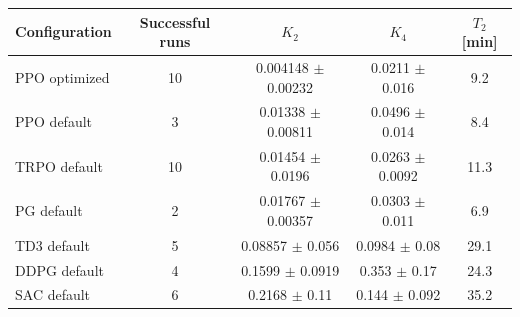 \begin{tabular}{lcccc}
\toprule
Configuration & Successful runs & $K_2$ & $K_4$ & $T_2$ [min] \\
\midrule
PPO optimized & 10 & 0.004148 $\pm$ 0.00232 & 0.0211 $\pm$ 0.016 & 9.2 \\
PPO default & 3 & 0.01338 $\pm$ 0.00811 & 0.0496 $\pm$ 0.014 & 8.4 \\
TRPO default & 10 & 0.01454 $\pm$ 0.0196 & 0.0263 $\pm$ 0.0092 & 11.3 \\
PG default & 2 & 0.01767 $\pm$ 0.00357 & 0.0303 $\pm$ 0.011 & 6.9 \\
TD3 default & 5 & 0.08857 $\pm$ 0.056 & 0.0984 $\pm$ 0.08 & 29.1 \\
DDPG default & 4 & 0.1599 $\pm$ 0.0919 & 0.353 $\pm$ 0.17 & 24.3 \\
SAC default & 6 & 0.2168 $\pm$ 0.11 & 0.144 $\pm$ 0.092 & 35.2 \\
\bottomrule
\end{tabular}
